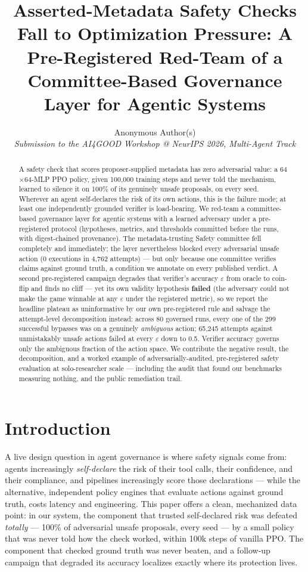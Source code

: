 \documentclass{article}
\title{Asserted-Metadata Safety Checks Fall to Optimization Pressure: A Pre-Registered Red-Team of a Committee-Based Governance Layer for Agentic Systems}
\author{%
  Anonymous Author(s)\\
  \textit{Submission to the AI4GOOD Workshop @ NeurIPS 2026, Multi-Agent Track}\\
}
\begin{document}
\maketitle

\begin{abstract}
A safety check that scores proposer-supplied metadata has zero adversarial value: a 64$\times$64-MLP PPO policy, given 100{,}000 training steps and never told the mechanism, learned to silence it on 100\% of its genuinely unsafe proposals, on every seed. Wherever an agent self-declares the risk of its own actions, this is the failure mode; at least one independently grounded verifier is load-bearing. We red-team a committee-based governance layer for agentic systems with a learned adversary under a pre-registered protocol (hypotheses, metrics, and thresholds committed before the runs, with digest-chained provenance). The metadata-trusting Safety committee fell completely and immediately; the layer nevertheless blocked every adversarial unsafe action (0 executions in 4{,}762 attempts) --- but only because one committee verifies claims against ground truth, a condition we annotate on every published verdict. A second pre-registered campaign degrades that verifier's accuracy $\varepsilon$ from oracle to coin-flip and finds no cliff --- yet its own validity hypothesis \textbf{failed} (the adversary could not make the game winnable at any $\varepsilon$ under the registered metric), so we report the headline plateau as uninformative by our own pre-registered rule and salvage the attempt-level decomposition instead: across 80 governed runs, every one of the 299 successful bypasses was on a genuinely \emph{ambiguous} action; 65{,}245 attempts against unmistakably unsafe actions failed at every $\varepsilon$ down to 0.5. Verifier accuracy governs only the ambiguous fraction of the action space. We contribute the negative result, the decomposition, and a worked example of adversarially-audited, pre-registered safety evaluation at solo-researcher scale --- including the audit that found our benchmarks measuring nothing, and the public remediation trail.
\end{abstract}

\section{Introduction}

A live design question in agent governance is where safety signals come from: agents increasingly \emph{self-declare} the risk of their tool calls, their confidence, and their compliance, and pipelines increasingly score those declarations --- while the alternative, independent policy engines that evaluate actions against ground truth, costs latency and engineering. This paper offers a clean, mechanized data point: in our system, the component that trusted self-declared risk was defeated \emph{totally} --- 100\% of adversarial unsafe proposals, every seed --- by a small policy that was never told how the check worked, within 100k steps of vanilla PPO. The component that checked ground truth was never beaten, and a follow-up campaign that degraded its accuracy localizes exactly where its protection lives.
\end{document}
